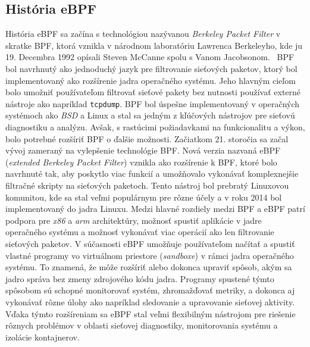 \subsection{História eBPF}
História eBPF sa začína s technológiou nazývanou \emph{Berkeley Packet Filter} v skratke BPF, ktorá vznikla v národnom laboratóriu Lawrenca Berkeleyho, 
kde ju 19. Decembra 1992 opísali Steven McCanne spolu s Vanom Jacobsonom.~\cite{bpf} BPF bol navrhnutý ako jednoduchý jazyk pre filtrovanie sieťových paketov, 
ktorý bol implementovaný ako rozšírenie jadra operačného systému. Jeho hlavným cieľom bolo umožniť používateľom filtrovať sieťové pakety bez nutnosti 
používať externé nástroje ako napríklad \texttt{tcpdump}. BPF bol úspešne implementovaný v operačných systémoch ako \emph{BSD} a Linux a stal sa jedným z 
kľúčových nástrojov pre sieťovú diagnostiku a analýzu. Avšak, s rastúcimi požiadavkami na funkcionalitu a výkon, bolo potrebné rozšíriť BPF o ďalšie možnosti. 
Začiatkom 21. storočia sa začal vývoj zameraný na vylepšenie technológie BPF. Nová verzia nazvaná eBPF (\emph{extended Berkeley Packet Filter}) vznikla ako 
rozšírenie k BPF, ktoré bolo navrhnuté tak, aby poskytlo viac funkcií a umožňovalo vykonávať komplexnejšie filtračné skripty na sieťových paketoch. 
Tento nástroj bol prebratý Linuxovou komunitou, kde sa stal veľmi populárnym pre rôzne účely a v roku 2014 bol implementovaný do jadra Linuxu. 
Medzi hlavné rozdiely medzi BPF a eBPF patrí podpora pre \emph{x86} a \emph{arm} architektúry, možnosť spustiť aplikácie v jadre operačného systému a možnosť 
vykonávať viac operácií ako len filtrovanie sieťových paketov. V súčasnosti eBPF umožňuje používateľom načítať a spustiť vlastné programy vo 
virtuálnom priestore (\emph{sandboxe}) v rámci jadra operačného systému. To znamená, že môže rozšíriť alebo dokonca upraviť spôsob, akým sa jadro správa 
bez zmeny zdrojového kódu jadra. Programy spustené týmto spôsobom sú schopné monitorovať systém, zhromažďovať metriky, a dokonca aj vykonávať 
rôzne úlohy ako napríklad sledovanie a upravovanie sieťovej aktivity. Vďaka týmto rozšíreniam sa eBPF stal veľmi flexibilným nástrojom pre 
riešenie rôznych problémov v oblasti sieťovej diagnostiky, monitorovania systému a izolácie kontajnerov.

